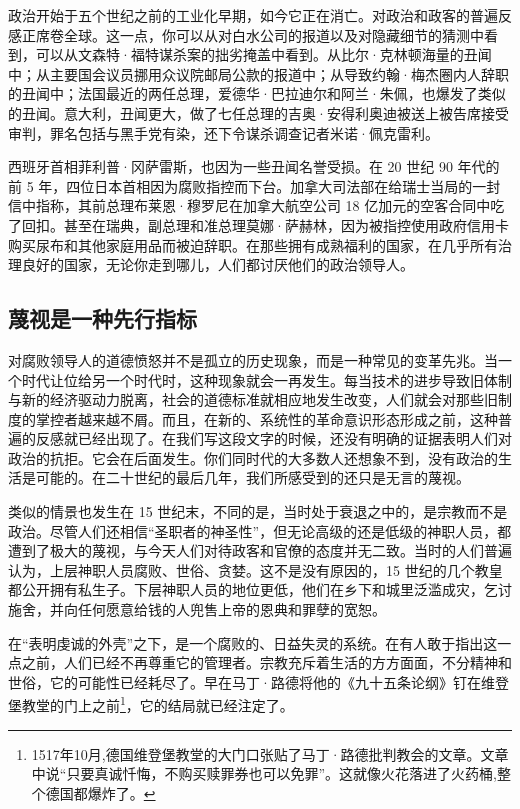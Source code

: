 政治开始于五个世纪之前的工业化早期，如今它正在消亡。对政治和政客的普遍反感正席卷全球。这一点，你可以从对白水公司的报道以及对隐藏细节的猜测中看到，可以从文森特·福特谋杀案的拙劣掩盖中看到。从比尔·克林顿海量的丑闻中；从主要国会议员挪用众议院邮局公款的报道中；从导致约翰·梅杰圈内人辞职的丑闻中；法国最近的两任总理，爱德华·巴拉迪尔和阿兰·朱佩，也爆发了类似的丑闻。意大利，丑闻更大，做了七任总理的吉奥·安得利奥迪被送上被告席接受审判，罪名包括与黑手党有染，还下令谋杀调查记者米诺·佩克雷利。

西班牙首相菲利普·冈萨雷斯，也因为一些丑闻名誉受损。在 20 世纪 90 年代的前 5 年，四位日本首相因为腐败指控而下台。加拿大司法部在给瑞士当局的一封信中指称，其前总理布莱恩·穆罗尼在加拿大航空公司 18 亿加元的空客合同中吃了回扣。甚至在瑞典，副总理和准总理莫娜·萨赫林，因为被指控使用政府信用卡购买尿布和其他家庭用品而被迫辞职。在那些拥有成熟福利的国家，在几乎所有治理良好的国家，无论你走到哪儿，人们都讨厌他们的政治领导人。

\subsection{蔑视是一种先行指标}
对腐败领导人的道德愤怒并不是孤立的历史现象，而是一种常见的变革先兆。当一个时代让位给另一个时代时，这种现象就会一再发生。每当技术的进步导致旧体制与新的经济驱动力脱离，社会的道德标准就相应地发生改变，人们就会对那些旧制度的掌控者越来越不屑。而且，在新的、系统性的革命意识形态形成之前，这种普遍的反感就已经出现了。在我们写这段文字的时候，还没有明确的证据表明人们对政治的抗拒。它会在后面发生。你们同时代的大多数人还想象不到，没有政治的生活是可能的。在二十世纪的最后几年，我们所感受到的还只是无言的蔑视。

类似的情景也发生在 15 世纪末，不同的是，当时处于衰退之中的，是宗教而不是政治。尽管人们还相信“圣职者的神圣性”，但无论高级的还是低级的神职人员，都遭到了极大的蔑视，与今天人们对待政客和官僚的态度并无二致。当时的人们普遍认为，上层神职人员腐败、世俗、贪婪。这不是没有原因的，15 世纪的几个教皇都公开拥有私生子。下层神职人员的地位更低，他们在乡下和城里泛滥成灾，乞讨施舍，并向任何愿意给钱的人兜售上帝的恩典和罪孽的宽恕。

在“表明虔诚的外壳”之下，是一个腐败的、日益失灵的系统。在有人敢于指出这一点之前，人们已经不再尊重它的管理者。宗教充斥着生活的方方面面，不分精神和世俗，它的可能性已经耗尽了。早在马丁·路德将他的《九十五条论纲》钉在维登堡教堂的门上之前\footnote{1517年10月,德国维登堡教堂的大门口张贴了马丁·路德批判教会的文章。文章中说“只要真诚忏悔，不购买赎罪券也可以免罪”。这就像火花落进了火药桶,整个德国都爆炸了。}，它的结局就已经注定了。

